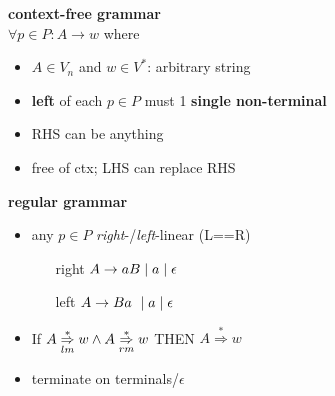 \begin{minipage}[t]{0.45\linewidth}
  \textbf{context-free grammar}\\
\(\forall p \in P: A \rightarrow w\) where
\begin{itemize}
\item \(A \in V_{n}\) and \(w \in V^{*}\): arbitrary string
\item \textbf{left} of each \(p \in P\) must 1 \textbf{single non-terminal}
\item RHS can be anything
\item free of ctx; LHS can replace RHS
\end{itemize}
\end{minipage}
\begin{minipage}[t]{0.45\linewidth}
  \textbf{regular grammar}
\begin{itemize}
\item any \(p \in P\) \emph{right}-/\emph{left}-linear (L==R)
  \begin{itemize}[leftmargin=3em]
  \item[right] \(A \rightarrow aB \;|\; a \;|\; \epsilon\)
  \item[left] \(A \rightarrow Ba\ \;|\; a \;|\; \epsilon\)
  \end{itemize}
\item If \(A \overset{*}{\underset{lm}{\Rightarrow}} w \wedge A \overset{*}{\underset{rm}{\Rightarrow}} w\) THEN \(A \overset{*}{\Rightarrow} w\)
\item terminate on terminals/\(\epsilon\)
\end{itemize}
\end{minipage}
